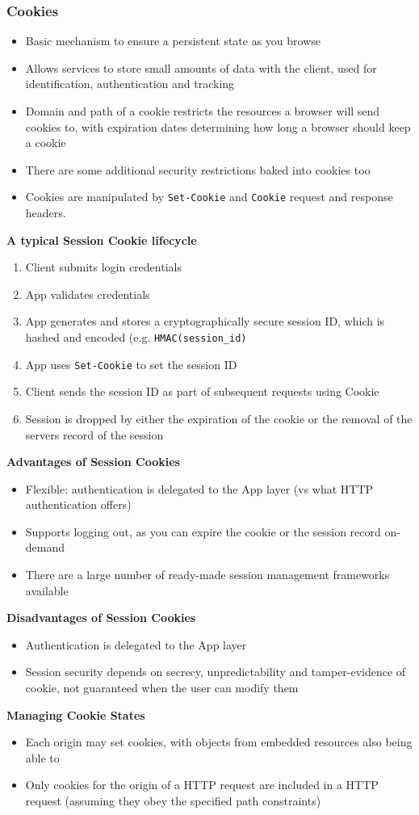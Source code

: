 \documentclass{article}
\begin{document}
\subsubsection{Cookies}
\begin{itemize}
    \item Basic mechanism to ensure a persistent state as you browse
    \item Allows services to store small amounts of data with the client, used for identification, authentication and tracking
    \item Domain and path of a cookie restricts the resources a browser will send cookies to, with expiration dates determining how long a browser should keep a cookie
    \item There are some additional security restrictions baked into cookies too
    \item Cookies are manipulated by \verb|Set-Cookie| and \verb|Cookie| request and response headers.
\end{itemize}
\textbf{A typical Session Cookie lifecycle}
\begin{enumerate}
    \item Client submits login credentials
    \item App validates credentials
    \item App generates and stores a cryptographically secure session ID, which is hashed and encoded (e.g. \verb|HMAC(session_id)|
    \item App uses \verb|Set-Cookie| to set the session ID
    \item Client sends the session ID as part of subsequent requests using Cookie
    \item Session is dropped by either the expiration of the cookie or the removal of the servers record of the session
\end{enumerate}
\textbf{Advantages of Session Cookies}
\begin{itemize}
    \item Flexible: authentication is delegated to the App layer (vs what HTTP authentication offers)
    \item Supports logging out, as you can expire the cookie or the session record on-demand
    \item There are a large number of ready-made session management frameworks available
\end{itemize}
\textbf{Disadvantages of Session Cookies}
\begin{itemize}
    \item Authentication is delegated to the App layer
    \item Session security depends on secrecy, unpredictability and tamper-evidence of cookie, not guaranteed when the user can modify them
\end{itemize}
\textbf{Managing Cookie States}
\begin{itemize}
    \item Each origin may set cookies, with objects from embedded resources also being able to
    \item Only cookies for the origin of a HTTP request are included in a HTTP request (assuming they obey the specified path constraints)
\end{itemize}
\end{document}
